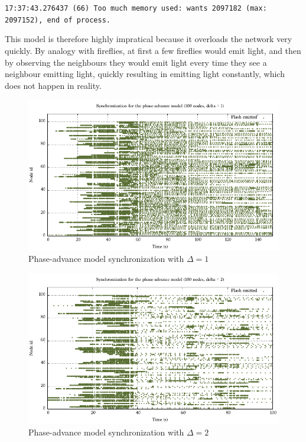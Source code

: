 \documentclass[a4paper, 11pt]{article}
\theoremstyle{plain}
\theoremstyle{definition}
\begin{document}
     \begin{displayquote}
       \texttt{17:37:43.276437 (66)  Too much memory used: wants 2097182 (max: 2097152), end of process.}
     \end{displayquote}

     This model is therefore highly impratical because it overloads the network very quickly. By analogy with
     fireflies, at first a few fireflies would emit light, and then by observing the neighbours they would
     emit light every time they see a neighbour emitting light, quickly resulting in emitting light constantly, which
     does not happen in reality. 

     \begin{figure}[h]
       \centering
       \includegraphics[width=\textwidth]{../Plots/Firefly-pa-100nodes-1-9.pdf}
       \caption{Phase-advance model synchronization with $\Delta = 1$}
       \label{fig:pa-sync-d1}
     \end{figure}

     \begin{figure}[h]
       \centering
       \includegraphics[width=\textwidth]{../Plots/Firefly-pa-100nodes-2-6.pdf}
       \caption{Phase-advance model synchronization with $\Delta = 2$}
       \label{fig:pa-sync-d2}
     \end{figure}
\end{document}
